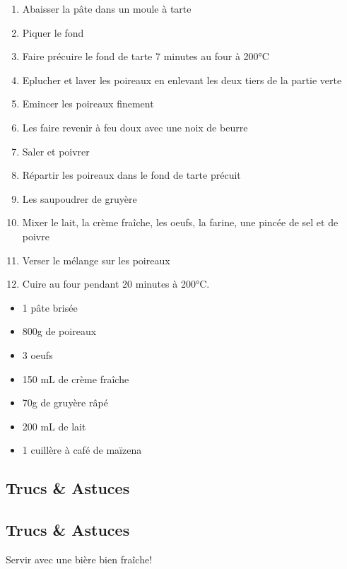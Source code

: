     \begin{minipage}{.7\textwidth}
        \begin{enumerate}
            \item Abaisser la pâte dans un moule à tarte
	    \item Piquer le fond
	    \item Faire précuire le fond de tarte 7 minutes au four à 200°C
	    \item Eplucher et laver les poireaux en enlevant les deux tiers de la partie verte
	    \item Emincer les poireaux finement
	    \item Les faire revenir à feu doux avec une noix de beurre
	    \item Saler et poivrer
	    \item Répartir les poireaux dans le fond de tarte précuit
	    \item Les saupoudrer de gruyère
	    \item Mixer le lait, la crème fraîche, les oeufs, la farine, une pincée de sel et de poivre
	    \item Verser le mélange sur les poireaux
	    \item Cuire au four pendant 20 minutes à 200°C.

        \end{enumerate}
    \end{minipage}
    \begin{minipage}{.3\textwidth}
        \begin{flushleft}
        \begin{itemize}
            \item 1 pâte brisée
	    \item 800g de poireaux
	    \item 3 oeufs
	    \item 150 mL de crème fraîche
	    \item 70g de gruyère râpé
	    \item 200 mL de lait
	    \item 1 cuillère à café de maïzena

        \end{itemize}
        \end{flushleft}
    \end{minipage}
    
    \vspace{1cm}
    \hline
    \vspace{1cm}
    
    \subsection{Trucs \& Astuces}
        \subsection{Trucs \& Astuces}
	Servir avec une bière bien fraîche!
